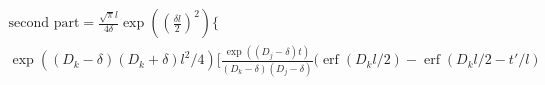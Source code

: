 \documentclass[a4paper]{article}
\newcommand{\erf}{\operatorname{erf}}
\begin{document}
\begin{multline}
  \text{second part}
  =
  \frac{\sqrt{\pi}l}{4\delta}\exp\left(\left(\frac{\delta l}{2}\right)^2\right)
  \bigg\{ \\
  \exp((D_k-\delta)(D_k+\delta)l^2/4) \bigg[
  \frac{\exp((D_j-\delta) t)}{(D_k-\delta)(D_j-\delta)}
  \bigg(
  \erf(D_k l/2) - \erf(D_k l/2  - t'/l)

\end{multline}
\end{document}
